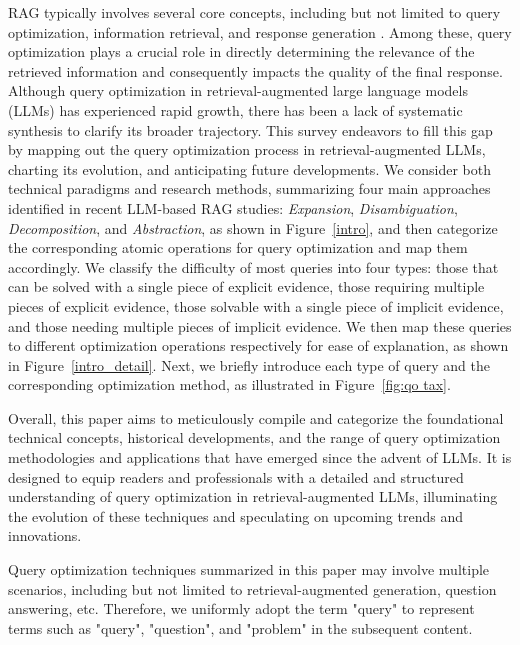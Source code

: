 \documentclass[11pt]{article}
\begin{document}
RAG typically involves several core concepts, including but not limited to query optimization, information retrieval, and response generation \cite{survey3, survey4, survey5}. Among these, query optimization plays a crucial role in directly determining the relevance of the retrieved information and consequently impacts the quality of the final response. Although query optimization in retrieval-augmented large language models (LLMs) has experienced rapid growth, there has been a lack of systematic synthesis to clarify its broader trajectory. This survey endeavors to fill this gap by mapping out the query optimization process in retrieval-augmented LLMs, charting its evolution, and anticipating future developments.
We consider both technical paradigms and research methods, summarizing four main approaches identified in recent LLM-based RAG studies: \textit{Expansion}, \textit{Disambiguation}, \textit{Decomposition}, and \textit{Abstraction}, as shown in Figure~\ref{intro}, and then categorize the corresponding atomic operations for query optimization and map them accordingly. We classify the difficulty of most queries into four types: those that can be solved with a single piece of explicit evidence, those requiring multiple pieces of explicit evidence, those solvable with a single piece of implicit evidence, and those needing multiple pieces of implicit evidence. We then map these queries to different optimization operations respectively for ease of explanation, as shown in Figure~\ref{intro_detail}. Next, we briefly introduce each type of query and the corresponding optimization method, as illustrated in Figure~\ref{fig:qo tax}.

Overall, this paper aims to meticulously compile and categorize the foundational technical concepts, historical developments, and the range of query optimization methodologies and applications that have emerged since the advent of LLMs. It is designed to equip readers and professionals with a detailed and structured understanding of query optimization in retrieval-augmented LLMs, illuminating the evolution of these techniques and speculating on upcoming trends and innovations.



Query optimization techniques summarized in this paper may involve multiple scenarios, including but not limited to retrieval-augmented generation, question answering, etc. Therefore, we uniformly adopt the term "query" to represent terms such as "query", "question", and "problem" in the subsequent content.
\end{document}
